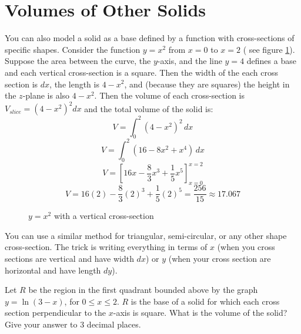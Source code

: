 \section{Volumes of Other Solids}
You can also model a solid as a base defined by a function with cross-sections 
of specific shapes. Consider the function $y = x^2$ from $x = 0$ to $x = 2$ (
see figure \ref{fig:parab}). Suppose the area between the curve, the $y$-axis, 
and the line $y = 4$ defines a base and each vertical cross-section is a 
square. Then the width of the each cross section is $dx$, the length is $4 - 
x^2$, and (because they are squares) the height in the $z$-plane is also $4 - 
x^2$. Then the volume of each cross-section is $V_{slice} = \left(4 - x^2 
\right)^2 dx$ and the total volume of the solid is:
$$V = \int_0^2 \left(4 - x^2 \right) ^ 2\,dx$$
$$V = \int_0^2 \left( 16 - 8x^2 + x^4 \right)\,dx$$
$$V = \left[16x - \frac{8}{3}x^3 + \frac{1}{5}x^5 \right]_{x = 0}^{x = 2}$$
$$V = 16(2) - \frac{8}{3}(2)^3 + \frac{1}{5}(2)^5 = \frac{256}{15} 
\approx 17.067$$

\begin{figure}[htbp]
\centering
	\caption{$y = x^2$ with a vertical cross-section}
	\label{fig:parab} 
\end{figure}

You can use a similar method for triangular, semi-circular, or any other shape 
cross-section. The trick is writing everything in terms of $x$ (when you cross 
sections are vertical and have width $dx$) or $y$ (when your cross section are 
horizontal and have length $dy$). 

\begin{Exercise} Let $R$ be the region in the first 
quadrant bounded above by the graph $y = \ln{(3 - x)}$, for $0 \leq x \leq 2$. 
$R$ is the base of a solid for which each cross section perpendicular to the 
$x$-axis is square. What is the volume of the solid? Give your answer to 3 
decimal places. 
\end{Exercise}

